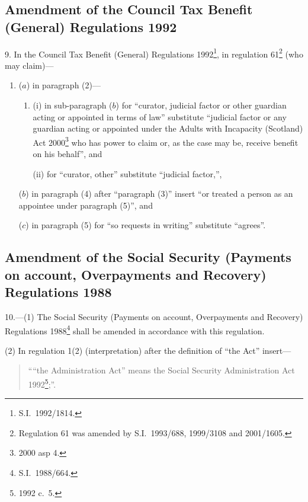 \documentclass[12pt,a4paper]{article}
\begin{document}
\subsection[9. Amendment of the Council Tax Benefit (General) Regulations 1992]{Amendment of the Council Tax Benefit (General) Regulations 1992}

9.  In the Council Tax Benefit (General) Regulations 1992\footnote{S.I.\ 1992/1814.}, in regulation 61\footnote{Regulation 61 was amended by S.I.\ 1993/688, 1999/3108 and 2001/1605.} (who may claim)—
\begin{enumerate}\item[]
($a$) in paragraph (2)—
\begin{enumerate}\item[]
(i) in sub-paragraph ($b$)  for “curator, judicial factor or other guardian acting or appointed in terms of law” substitute “judicial factor or any guardian acting or appointed under the Adults with Incapacity (Scotland) Act 2000\footnote{2000 asp 4.} who has power to claim or, as the case may be, receive benefit on his behalf”, and

(ii) for “curator, other” substitute “judicial factor,”,
\end{enumerate}

($b$) in paragraph (4) after “paragraph (3)” insert “or treated a person as an appointee under paragraph (5)”, and

($c$) in paragraph (5) for “so requests in writing” substitute “agrees”.
\end{enumerate}

\subsection[10. Amendment of the Social Security (Payments on account, Overpayments and Recovery) Regulations 1988]{\sloppy Amendment of the Social Security (Payments on account, Overpayments and Recovery) Regulations 1988}

10.---(1)  The Social Security (Payments on account, Overpayments and Recovery) Regulations 1988\footnote{S.I.\ 1988/664.} shall be amended in accordance with this regulation.

(2) In regulation 1(2) (interpretation) after the definition of “the Act” insert—
\begin{quotation}
““the Administration Act” means the Social Security Administration Act 1992\footnote{1992 c.\ 5.};”.
\end{quotation}
\end{document}
